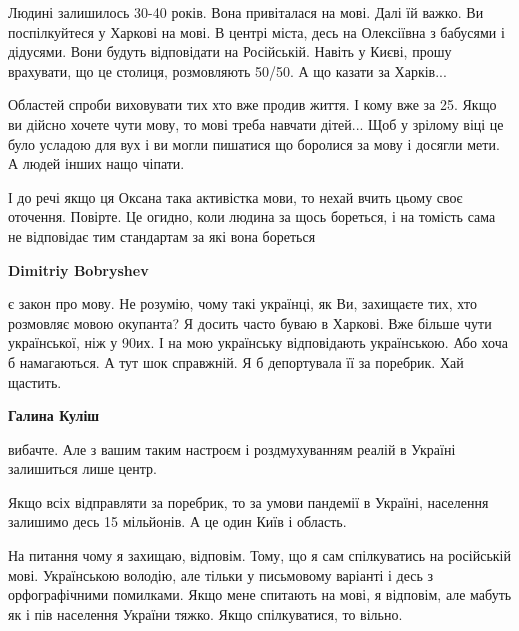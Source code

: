 \begin{itemize}
\begin{itemize}
Людині залишилось 30-40 років. Вона привіталася на мові. Далі їй важко. Ви
поспілкуйтеся у Харкові на мові. В центрі міста, десь на Олексіївна з бабусями
і дідусями. Вони будуть відповідати на Російській. Навіть у Києві, прошу
врахувати, що це столиця, розмовляють 50/50. А що казати за Харків...

Областей спроби виховувати тих хто вже продив життя. І кому вже за 25. Якщо ви
дійсно хочете чути мову, то мові треба навчати дітей... Щоб у зрілому віці це
було усладою для вух і ви могли пишатися що боролися за мову і досягли мети. А
людей інших нащо чіпати.

І до речі якщо ця Оксана така активістка мови, то нехай вчить цьому своє
оточення. Повірте. Це огидно, коли людина за щось бореться, і на томість сама
не відповідає тим стандартам за які вона бореться

 
\textbf{Dimitriy Bobryshev} 

є закон про мову. Не розумію, чому такі українці,
як Ви, захищаєте тих, хто розмовляє мовою окупанта? Я досить часто буваю в
Харкові. Вже більше чути української, ніж у 90их. І на мою українську
відповідають українською. Або хоча б намагаються. А тут шок справжній. Я б
депортувала її за поребрик. Хай щастить.

 
\textbf{Галина Куліш} 

вибачте. Але з вашим таким настроєм і роздмухуванням реалій в Україні
залишиться лише центр.

Якщо всіх відправляти за поребрик, то за умови пандемії в Україні, населення
залишимо десь 15 мільйонів. А це один Київ і область.

На питання чому я захищаю, відповім. Тому, що я сам спілкуватись на російській
мові. Українською володію, але тільки у письмовому варіанті і десь з
орфографічними помилками. Якщо мене спитають на мові, я відповім, але мабуть як
і пів населення України тяжко. Якщо спілкуватися, то вільно.


\end{itemize}
\end{itemize}
